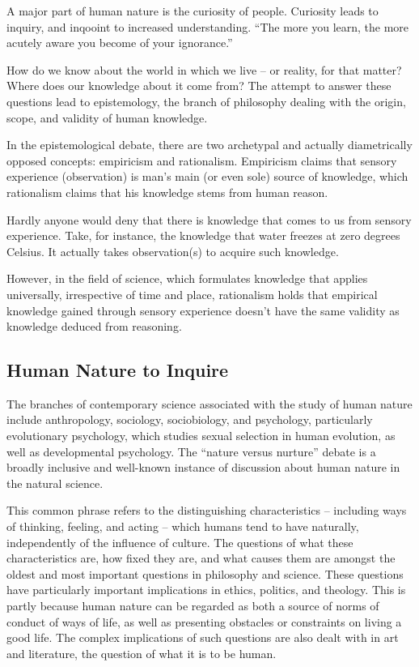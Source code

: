 A major part of human nature is the curiosity of people. Curiosity leads to inquiry, and inqooint to increased understanding. “The more you learn, the more acutely aware you become of your ignorance.”

How do we know about the world in which we live – or reality, for that matter?  Where does our knowledge about it come from?  The attempt to answer these questions lead to epistemology, the branch of philosophy dealing with the origin, scope, and validity of human knowledge.

In the epistemological debate, there are two archetypal and actually diametrically opposed concepts: empiricism and rationalism. Empiricism claims that sensory experience (observation) is man’s main (or even sole) source of knowledge, which rationalism claims that his knowledge stems from human reason.

Hardly anyone would deny that there is knowledge that comes to us from sensory experience. Take, for instance, the knowledge that water freezes at zero degrees Celsius. It actually takes observation(s) to acquire such knowledge.

However, in the field of science, which formulates knowledge that applies universally, irrespective of time and place, rationalism holds that empirical knowledge gained through sensory experience doesn’t have the same validity as knowledge deduced from reasoning.
    
\subsection{Human Nature to Inquire}

The branches of contemporary science associated with the study of human nature include anthropology, sociology, sociobiology, and psychology, particularly evolutionary psychology, which studies sexual selection in human evolution, as well as developmental psychology. The ``nature versus nurture'' debate is a broadly inclusive and well-known instance of discussion about human nature in the natural science.

This common phrase refers to the distinguishing characteristics – including ways of thinking, feeling, and acting – which humans tend to have naturally, independently of the influence of culture. The questions of what these characteristics are, how fixed they are, and what causes them are amongst the oldest and most important questions in philosophy and science. These questions have particularly important implications in ethics, politics, and theology. This is partly because human nature can be regarded as both a source of norms of conduct of ways of life, as well as presenting obstacles or constraints on living a good life. The complex implications of such questions are also dealt with in art and literature, the question of what it is to be human.

